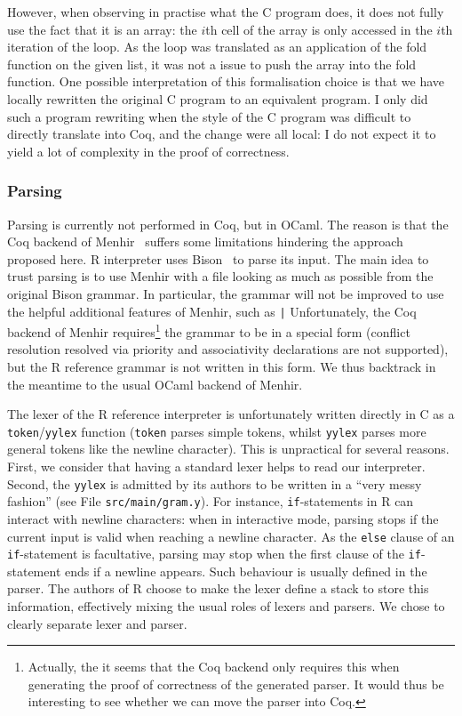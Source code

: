 \documentclass{article}
\newcommand\Coq{Coq}
\newcommand\OCaml{OCaml}
\newcommand\R{R}
\newcommand\Cn{C}
\begin{document}
However, when observing in practise what the \Cn{} program
does, it does not fully use the fact that it is an array:
the \(i\)th cell of the array is only accessed in the \(i\)th
iteration of the loop.
As the loop was translated as an application of the fold function
on the given list,
it was not a issue to push the array into the fold function.
One possible interpretation of this formalisation choice
is that we have locally rewritten the original \Cn{} program
to an equivalent program.
I only did such a program rewriting when the style of the \Cn{}
program was difficult to directly translate into \Coq{},
and the change were all local:
I do not expect it to yield a lot of complexity in the proof of correctness.


\subsubsection{Parsing}
\label{sec:parsing}

Parsing is currently not performed in \Coq{}, but in \OCaml{}.
The reason is that the \Coq{} backend of Menhir~\parencite{jourdan2012validating}
suffers some limitations hindering the approach proposed here.
\R{} interpreter uses Bison~\parencite{Bison} to parse its input.
The main idea to trust parsing
is to use Menhir with a file looking as much as possible
from the original Bison grammar.
In particular, the grammar will not be improved to use the helpful
additional features of Menhir,
such as \texttt|%
Unfortunately, the \Coq{} backend of Menhir requires\footnote{
    Actually, the it seems that the \Coq{} backend only requires
    this when generating the proof of correctness of the generated parser.
    It would thus be interesting to see whether we can move the parser
    into \Coq{}.
} the grammar to be in a special form
(conflict resolution resolved via priority and associativity declarations
are not supported),
but the \R{} reference grammar is not written in this form.
We thus backtrack in the meantime to the usual \OCaml{} backend of Menhir.

The lexer of the \R{} reference interpreter is unfortunately
written directly in \Cn{} as a \texttt{token}/\texttt{yylex} function
(\texttt{token} parses simple tokens,
whilst \texttt{yylex} parses more general tokens
like the newline character).
This is unpractical for several reasons.
First, we consider that having a standard lexer helps to read our interpreter.
Second, the \texttt{yylex} is admitted by its authors
to be written in a “very messy fashion”
(see File \texttt{src/main/gram.y}).
For instance, \texttt{if}-statements in \R{} can interact with
newline characters:
when in interactive mode, parsing stops if the current input is valid
when reaching a newline character.
As the \texttt{else} clause of an \texttt{if}-statement
is facultative,
parsing may stop when the first clause of the \texttt{if}-statement
ends if a newline appears.
Such behaviour is usually defined in the parser.
The authors of \R{} choose to make the lexer define a stack
to store this information,
effectively mixing the usual roles of lexers and parsers.
We chose to clearly separate lexer and parser.
\end{document}
